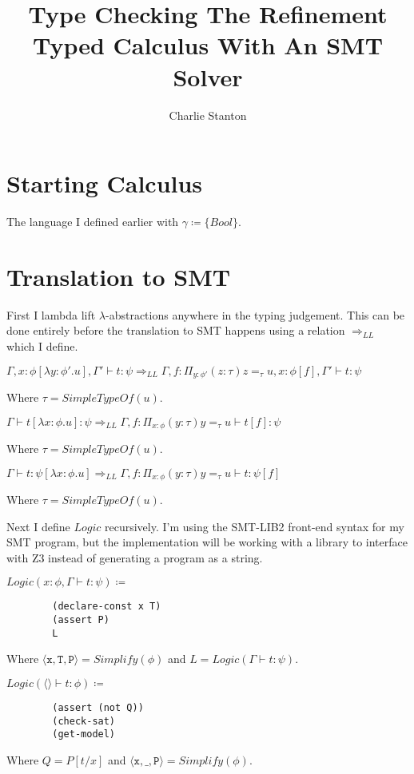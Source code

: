 \documentclass[12pt,a4paper,titlepage]{article}
\title{Type Checking The Refinement Typed Calculus With An SMT Solver}
\author{Charlie Stanton}
\newcommand{\lnc}[1]{Logic(\langle \rangle \vdash #1)}
\newcommand{\triple}[3]{\langle \texttt{#1} , \texttt{#2} , \texttt{#3} \rangle}
\begin{document}
    \maketitle

    \section{Starting Calculus}
    The language I defined earlier with $\gamma \coloneqq \{Bool\}$.

    \section{Translation to SMT}
    First I lambda lift $\lambda$-abstractions anywhere in the typing judgement.
    This can be done entirely before the translation to SMT happens using a relation $\Rightarrow_{LL}$ which I define.

    $\Gamma, x: \phi[\lambda y: \phi' . u], \Gamma' \vdash t: \psi \Rightarrow_{LL}
    \Gamma, f: \Pi_{y: \phi'} (z: \tau) z =_\tau u, x: \phi[f], \Gamma' \vdash t: \psi$

    Where $\tau = SimpleTypeOf(u)$.

    $\Gamma \vdash t[\lambda x: \phi . u]: \psi \Rightarrow_{LL}
    \Gamma, f: \Pi_{x: \phi} (y: \tau) y =_\tau u \vdash t[f]: \psi$

    Where $\tau = SimpleTypeOf(u)$.

    $\Gamma \vdash t: \psi[\lambda x: \phi . u] \Rightarrow_{LL}
    \Gamma, f: \Pi_{x: \phi} (y: \tau) y =_\tau u \vdash t: \psi[f]$

    Where $\tau = SimpleTypeOf(u)$.

    Next I define $Logic$ recursively.
    I'm using the SMT-LIB2 front-end syntax for my SMT program, but the implementation will be working with
    a library to interface with Z3 instead of generating a program as a string.

    $Logic(x: \phi, \Gamma \vdash t: \psi) \coloneqq$
    \begin{verbatim}
        (declare-const x T)
        (assert P)
        L
    \end{verbatim}
    Where $\triple{x}{T}{P} = Simplify(\phi)$ and $L = Logic(\Gamma \vdash t: \psi)$.

    $\lnc{t: \phi} \coloneqq$
    \begin{verbatim}
        (assert (not Q))
        (check-sat)
        (get-model)
    \end{verbatim}
    Where $Q = P[t/x]$ and $\triple{x}{\_}{P} = Simplify(\phi)$.
\end{document}
